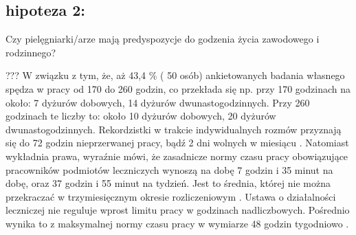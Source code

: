 \documentclass[a4paper,12pt,twoside,openany]{report}
\begin{document}

\subsection{hipoteza 2:} 


Czy  pielęgniarki/arze mają predyspozycje do godzenia życia zawodowego i rodzinnego? 

??? W związku z tym, że, aż 43,4 \%  ( 50 osób) ankietowanych badania własnego spędza w pracy od 170 do 260 godzin, co przekłada się np. przy 170 godzinach na około:  7 dyżurów dobowych, 14 dyżurów dwunastogodzinnych. Przy 260 godzinach te liczby to: około  10 dyżurów dobowych, 20 dyżurów dwunastogodzinnych. Rekordzistki w trakcie indywidualnych rozmów przyznają się do 72 godzin nieprzerwanej pracy, bądź 2 dni wolnych w miesiącu \cite{cyfrowe}. Natomiast wykładnia prawa, wyraźnie mówi, że zasadnicze normy czasu pracy obowiązujące pracowników podmiotów leczniczych wynoszą na dobę 7 godzin i 35 minut na dobę, oraz 37 godzin i 55 minut na tydzień. Jest to średnia, której nie można przekraczać w trzymiesięcznym okresie rozliczeniowym \cite{okres}. Ustawa o działalności leczniczej nie reguluje wprost limitu pracy w godzinach nadliczbowych. Pośrednio wynika to z maksymalnej normy czasu pracy w wymiarze 48 godzin tygodniowo \cite{klauzula}.
\end{document}
